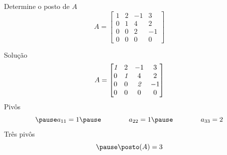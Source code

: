 \begin{question}
Determine o posto de $A$
\[
  A =
  \begin{bmatrix}
    1 & 2 & -1 & 3  \\
    0 & 1 & 4  & 2  \\
    0 & 0 & 2  & -1 \\
    0 & 0 & 0  & 0
  \end{bmatrix}
\]
\end{question}

\begin{resolution}{Solução}
\[
  A =
  \begin{bmatrix}
    \emph{1} & 2        & -1       & 3  \\
    0        & \emph{1} & 4        & 2  \\
    0        & 0        & \emph{2} & -1 \\
    0        & 0        & 0        & 0
  \end{bmatrix}
\]
\pause
Pivôs
\[
  \pause
  a_{11} = 1
  \pause  \qquad\qquad
  a_{22} = 1
  \pause  \qquad\qquad
  a_{33} = 2
\]
\pause
Três pivôs
\[
  \pause
  \posto(A) = 3
\]
\end{resolution}

\endinput
